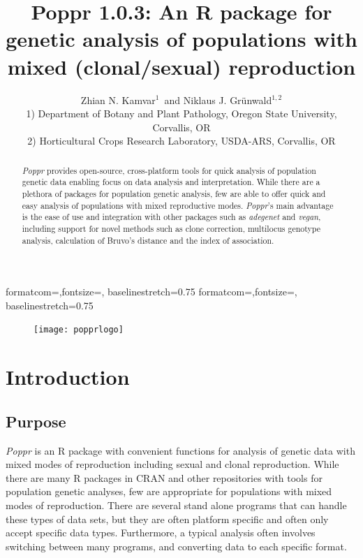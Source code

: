 \documentclass[letterpaper]{article}
\title{Poppr 1.0.3: An R package for genetic analysis of populations with mixed (clonal/sexual) reproduction}
\author{Zhian N. Kamvar$^{1}$\ and Niklaus J. Gr\"unwald$^{1,2}$\\\scriptsize{1) Department of Botany and Plant Pathology, Oregon State University, Corvallis, OR}\\\scriptsize{2) Horticultural Crops Research Laboratory, USDA-ARS, Corvallis, OR}}
\newcommand{\tab}{\hspace*{1em}}
\begin{document}

{formatcom={\color{Sinput}},fontsize=\footnotesize, baselinestretch=0.75}
{formatcom={\color{Soutput}},fontsize=\footnotesize, baselinestretch=0.75}
\maketitle
\begin{abstract}
\textit{Poppr} provides open-source, cross-platform tools for quick analysis of population genetic data enabling focus on data analysis and interpretation. While there are a plethora of packages for population genetic analysis, few are able to offer quick and easy analysis of populations with mixed reproductive modes. \textit{Poppr}'s main advantage is the ease of use and integration with other packages such as \textit{adegenet} and \textit{vegan}, including support for novel methods such as clone correction, multilocus genotype analysis, calculation of Bruvo's distance and the index of association. 
\end{abstract}
\begin{figure}[b]
  \centering
  \label{logo}
  \texttt{[image: popprlogo]}
\end{figure}
\newpage
\begingroup
\hypersetup{linkcolor=black}
\tableofcontents
\endgroup

\section{Introduction}\label{intro}
\subsection{Purpose}\label{intro:purpose}

\tab\tab\textit{Poppr} is an R package with convenient functions for analysis of genetic data with mixed modes of reproduction including sexual and clonal reproduction. While there are many R packages in CRAN and other repositories with tools for population genetic analyses, few are appropriate for populations with mixed modes of reproduction. There are several stand alone programs that can handle these types of data sets, but they are often platform specific and often only accept specific data types. Furthermore, a typical analysis often involves switching between many programs, and converting data to each specific format.
\end{document}
